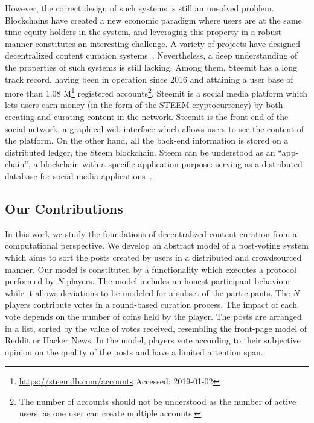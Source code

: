   However, the correct design of such systems is still an unsolved problem.
  Blockchains have created a new economic paradigm where users are at the same
  time equity holders in the system, and leveraging this property in a robust
  manner constitutes an interesting challenge. A variety of projects have
  designed decentralized content curation systems~\cite{synereo,steemit,tcr}.
  Nevertheless, a deep understanding of the properties of such systems is still
  lacking. Among them, Steemit has a long track record, having been in operation
  since 2016 and attaining a user base of more than 1.08
  M\footnote{\url{https://steemdb.com/accounts} Accessed: 2019-01-02} registered
  accounts\footnote{The number of accounts should not be understood as the
  number of active users, as one user can create multiple accounts.}. Steemit is
  a social media platform which lets users earn money (in the form of the STEEM
  cryptocurrency) by both creating and curating content in the network. Steemit
  is the front-end of the social network, a graphical web interface which allows
  users to see the content of the platform. On the other hand, all the back-end
  information is stored on a distributed ledger, the Steem blockchain. Steem can
  be understood as an ``app-chain'', a blockchain with a specific application
  purpose: serving as a distributed database for social media
  applications~\cite{steemit}.

  \subsection{Our Contributions}
    In this work we study the foundations of decentralized content curation from
    a computational perspective. We develop an abstract model of a post-voting
    system which aims to sort the posts created by users in a distributed and
    crowdsourced manner. Our model is constituted by a functionality which
    executes a protocol performed by $N$ players. The model includes an honest
    participant behaviour while it allows deviations to be modeled for a subset
    of the participants. The $N$ players contribute votes in a round-based
    curation process. The impact of each vote depends on the number of coins
    held by the player. The posts are arranged in a list, sorted by the value of
    votes received, resembling the front-page model of Reddit or Hacker News. In
    the model, players vote according to their subjective opinion on the quality
    of the posts and have a limited attention span.

